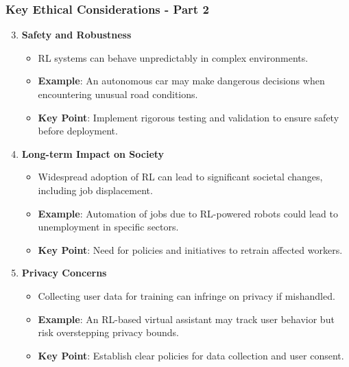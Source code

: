 \documentclass[aspectratio=169]{beamer}
\begin{document}
\begin{frame}[fragile]
    \frametitle{Key Ethical Considerations - Part 2}
    \begin{enumerate}
        \setcounter{enumi}{2} %
        \item \textbf{Safety and Robustness}
        \begin{itemize}
            \item RL systems can behave unpredictably in complex environments.
            \item \textbf{Example}: An autonomous car may make dangerous decisions when encountering unusual road conditions.
            \item \textbf{Key Point}: Implement rigorous testing and validation to ensure safety before deployment.
        \end{itemize}

        \item \textbf{Long-term Impact on Society}
        \begin{itemize}
            \item Widespread adoption of RL can lead to significant societal changes, including job displacement.
            \item \textbf{Example}: Automation of jobs due to RL-powered robots could lead to unemployment in specific sectors.
            \item \textbf{Key Point}: Need for policies and initiatives to retrain affected workers.
        \end{itemize}
        
        \item \textbf{Privacy Concerns}
        \begin{itemize}
            \item Collecting user data for training can infringe on privacy if mishandled.
            \item \textbf{Example}: An RL-based virtual assistant may track user behavior but risk overstepping privacy bounds.
            \item \textbf{Key Point}: Establish clear policies for data collection and user consent.
        \end{itemize}
    \end{enumerate}
\end{frame}
\end{document}
